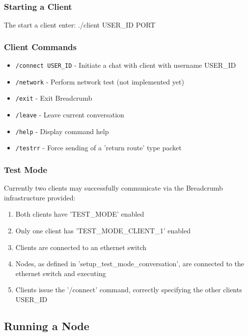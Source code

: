 \documentclass{article}
\begin{document}
\subsubsection{Starting a Client}
The start a client enter: ./client USER\_ID PORT
\subsubsection{Client Commands}
\begin{itemize}
	\item \texttt{/connect USER\_ID} - Initiate a chat with client with username USER\_ID
	\item \texttt{/network} - Perform network test (not implemented yet)
	\item \texttt{/exit} - Exit Breadcrumb
	\item \texttt{/leave} - Leave current conversation
	\item \texttt{/help} - Display command help
	\item \texttt{/testrr} - Force sending of a 'return route' type packet
\end{itemize}
\subsubsection{Test Mode}
Currently two clients may successfully communicate via the Breadcrumb infrastructure provided:
\begin{enumerate}
	\item Both clients have 'TEST\_MODE' enabled
	\item Only one client has 'TEST\_MODE\_CLIENT\_1' enabled
	\item Clients are connected to an ethernet switch
	\item Nodes, as defined in 'setup\_test\_mode\_conversation', are connected to the ethernet switch and executing
	\item Clients issue the '/connect' command, correctly specifying the other clients USER\_ID
\end{enumerate}
\subsection{Running a Node}
\end{document}
